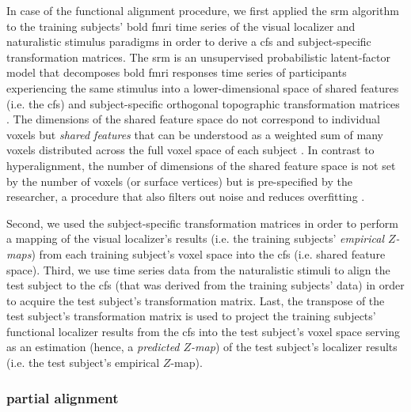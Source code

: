 
%
In case of the functional alignment procedure, we first applied the \ac{srm}
algorithm \citep{chen2015reduced, richard2019fast} to the training subjects'
\ac{bold} \ac{fmri} time series of the visual localizer and naturalistic
stimulus paradigms in order to derive a \ac{cfs} and subject-specific
transformation matrices.
%
The \ac{srm} is an unsupervised probabilistic latent-factor model that
decomposes \ac{bold} \ac{fmri} responses time series of participants
experiencing the same stimulus into a lower-dimensional space of shared features
(i.e. the \ac{cfs}) and subject-specific orthogonal topographic transformation
matrices \citep{kumar2020brainiak, cohen2017computational}.
%
The dimensions of the shared feature space do not correspond to individual
voxels but \textit{shared features} that can be understood as a weighted sum of
many voxels distributed across the full voxel space of each subject
\citep{kumar2020brainiak}.
%
In contrast to hyperalignment, the number of dimensions of the shared feature
space is not set by the number of voxels (or surface vertices) but is
pre-specified by the researcher, a procedure that also filters out noise and
reduces overfitting \citep{chen2015reduced}.

Second, we used the subject-specific transformation matrices in order to perform
a mapping of the visual localizer's results (i.e. the training subjects'
\textit{empirical $Z$-maps}) from each training subject's voxel space into the
\ac{cfs} (i.e. shared feature space).
Third, we use time series data from the naturalistic stimuli to align the test
subject to the \ac{cfs} (that was derived from the training subjects' data) in
order to acquire the test subject's transformation matrix.
Last, the transpose of the test subject's transformation matrix is used to
project the training subjects' functional localizer results from the \ac{cfs}
into the test subject's voxel space serving as an estimation (hence, a
\textit{predicted $Z$-map}) of the test subject's localizer results (i.e. the
test subject's empirical $Z$-map).





\subsubsection{partial alignment}

